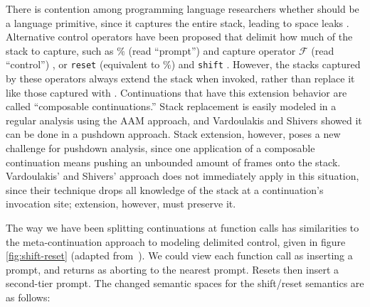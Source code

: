 There is contention among programming language researchers whether  should be a language primitive, since it captures the entire stack, leading to space leaks \citep{ianjohnson:kiselyov:against-callcc}.
%
Alternative control operators have been proposed that delimit how much of the stack to capture, such as $\%$ (read ``prompt'') and capture operator ${\mathcal F}$ (read ``control'') \citep{ianjohnson:felleisen:control:1988}, or \texttt{reset} (equivalent to $\%$) and \texttt{shift} \citep{ianjohnson:danvy:filinski:delim:1990}.
%
However, the stacks captured by these operators always extend the stack when invoked, rather than replace it like those captured with .
%
Continuations that have this extension behavior are called ``composable continuations.''
%
Stack replacement is easily modeled in a regular analysis using the AAM approach, and Vardoulakis and Shivers showed it can be done in a pushdown approach.
%
Stack extension, however, poses a new challenge for pushdown analysis, since one application of a composable continuation means pushing an unbounded amount of frames onto the stack.
%
Vardoulakis' and Shivers' approach does not immediately apply in this situation, since their technique drops all knowledge of the stack at a continuation's invocation site; extension, however, must preserve it.

The way we have been splitting continuations at function calls has similarities to the meta-continuation approach to modeling delimited control, given in figure \ref{fig:shift-reset} (adapted from~\citep{ianjohnson:Biernacki2006274}).
%
We could view each function call as inserting a prompt, and returns as aborting to the nearest prompt.
%
Resets then insert a second-tier prompt.
%
The changed semantic spaces for the shift/reset semantics are as follows:


